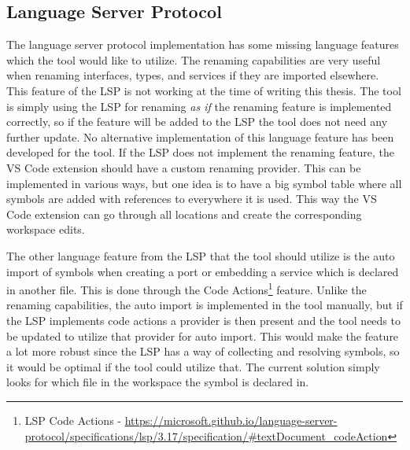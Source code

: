 


\subsection{Language Server Protocol}
The language server protocol implementation has some missing language features which the tool would like to utilize.
The renaming capabilities are very useful when renaming interfaces, types, and services if they are imported elsewhere. This feature of the LSP is not working at the time of writing this thesis.
The tool is simply using the LSP for renaming \textit{as if} the renaming feature is implemented correctly, so if the feature will be added to the LSP the tool does not need any further update.
No alternative implementation of this language feature has been developed for the tool. If the LSP does not implement the renaming feature, the VS Code extension should have a custom renaming provider.
This can be implemented in various ways, but one idea is to have a big symbol table where all symbols are added with references to everywhere it is used. This way the VS Code extension can go through all locations and create the corresponding workspace edits.

The other language feature from the LSP that the tool should utilize is the auto import of symbols when creating a port or embedding a service which is declared in another file.
This is done through the Code Actions\footnote{LSP Code Actions - \url{https://microsoft.github.io/language-server-protocol/specifications/lsp/3.17/specification/\#textDocument_codeAction}}
feature. Unlike the renaming capabilities, the auto import is implemented in the tool manually, but if the LSP implements code actions a provider is then present and the tool needs to be updated to utilize that provider for auto import.
This would make the feature a lot more robust since the LSP has a way of collecting and resolving symbols, so it would be optimal if the tool could utilize that. The current solution simply looks for which file in the workspace the symbol is declared in.

